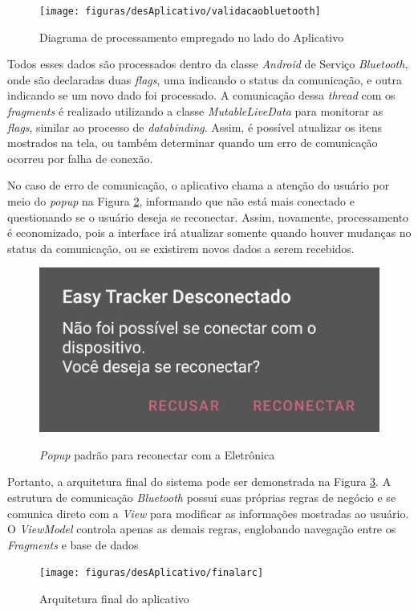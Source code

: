 \begin{figure}[!htb]
	\centering
	\caption{Diagrama de processamento empregado no lado do Aplicativo}
	\texttt{[image: figuras/desAplicativo/validacaobluetooth]}
	\label{fig:validacaobluetooth}
\end{figure}

Todos esses dados são processados dentro da classe \textit{Android} de Serviço \textit{Bluetooth}, onde são declaradas duas \textit{flags}, uma indicando o status da comunicação, e outra indicando se um novo dado foi processado. A comunicação dessa \textit{thread} com os \textit{fragments} é realizado utilizando a classe \textit{MutableLiveData} para monitorar as \textit{flags}, similar ao processo de \textit{databinding}. Assim, é possível atualizar os itens mostrados na tela, ou também determinar quando um erro de comunicação ocorreu por falha de conexão. 

No caso de erro de comunicação, o aplicativo chama a atenção do usuário por meio do \textit{popup} na Figura \ref{fig:popupreconect}, informando que não está mais conectado e questionando se o usuário deseja se reconectar. Assim, novamente, processamento é economizado, pois a interface irá atualizar somente quando houver mudanças no status da comunicação, ou se existirem novos dados a serem recebidos.

\begin{figure}[!htb]
	\centering
	\caption{\textit{Popup} padrão para reconectar com a Eletrônica}
	\includegraphics[width=0.4\linewidth]{figuras/desAplicativo/popupreconect}
	\label{fig:popupreconect}
\end{figure}

Portanto, a arquitetura final do sistema pode ser demonstrada na Figura \ref{fig:finalarc}. A estrutura de comunicação \textit{Bluetooth} possui suas próprias regras de negócio e se comunica direto com a \textit{View} para modificar as informações mostradas ao usuário. O \textit{ViewModel} controla apenas as demais regras, englobando navegação entre os \textit{Fragments} e base de dados

\begin{figure}[!htb]
	\centering
	\caption{Arquitetura final do aplicativo}
	\texttt{[image: figuras/desAplicativo/finalarc]}
	\label{fig:finalarc}
\end{figure}